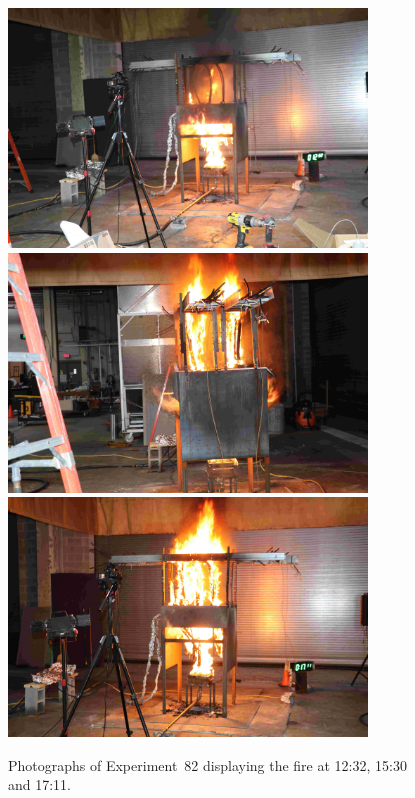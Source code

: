 \begin{figure}[p]
\centering
\includegraphics[height=2.50in]{../FIGURES/Test_82_Photo_1} \\ \vspace{0.1in}
\includegraphics[height=2.50in]{../FIGURES/Test_82_Photo_2} \\ \vspace{0.1in}
\includegraphics[height=2.50in]{../FIGURES/Test_82_Photo_3}
\caption[Photographs of Experiment~82]{Photographs of Experiment~82 displaying the fire at 12:32, 15:30 and 17:11.}
\label{fig:Test_82_photos}
\end{figure}


\clearpage

